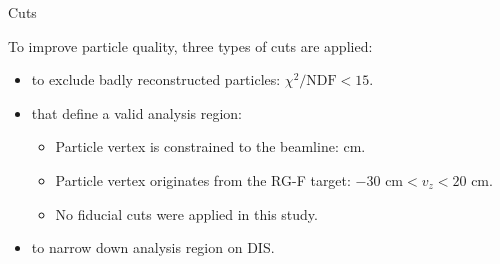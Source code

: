 \begin{frame}{Cuts}
    \label{11.21::summary}

    To improve particle quality, three types of cuts are applied:

    \vspace{12pt}

    \begin{itemize}
        \item
             to exclude badly reconstructed particles: \textcolor{efd_green}{$\chi^2/\text{NDF} < 15$}.

        \vspace{6pt}
        \item
             that define a valid analysis region:
            \begin{itemize}
                \vspace{6pt}
                \item
                    Particle vertex is constrained to the beamline:  \textcolor{efd_green}{cm}.

                \vspace{3pt}
                \item
                    Particle vertex originates from the RG-F target: \textcolor{efd_green}{$-30 \text{ cm} < v_z < 20 \text{ cm}$}.

                \vspace{3pt}
                \item
                    No fiducial cuts were applied in this study.
            \end{itemize}

        \vspace{6pt}
        \item
             to narrow down analysis region on DIS.
    \end{itemize}
\end{frame}

